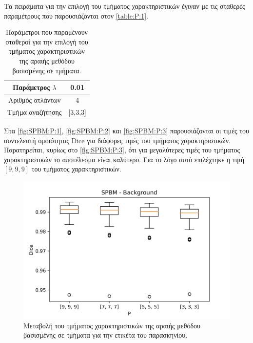 \documentclass[a4paper,12pt]{article}
\begin{document}
Τα πειράματα για την επιλογή του τμήματος χαρακτηριστικών έγιναν με τις σταθερές
παραμέτρους που παρουσιάζονται στον \autoref{table:P:1}.

\begin{table}[h!]
    \centering
    \begin{tabular}{|c|c|} 
        \hline
        Παράμετρος $\lambda$ & 0.01 \\ 
        \hline
        Αριθμός ατλάντων & 4 \\ 
        \hline
        Τμήμα αναζήτησης & [3,3,3] \\ 
        \hline
    \end{tabular}
    \caption{Παράμετροι που παραμένουν σταθεροί για την επιλογή του τμήματος
             χαρακτηριστικών της αραιής μεθόδου βασισμένης σε τμήματα.}
    \label{table:P:1}
\end{table}

Στα \autoref{fig:SPBM:P:1}, \autoref{fig:SPBM:P:2} και \autoref{fig:SPBM:P:3}
παρουσιάζονται οι τιμές του συντελεστή ομοιότητας Dice για διάφορες τιμές του
τμήματος χαρακτηριστικών. Παρατηρείται, κυρίως στο \autoref{fig:SPBM:P:3}, ότι
για μεγαλύτερες τιμές του τμήματος χαρακτηριστικών το αποτέλεσμα είναι καλύτερο.
Για το λόγο αυτό επιλέχτηκε η τιμή $[9,9,9]$ του τμήματος χαρακτηριστικών.

\begin{figure}[H]
    \centering
    \includegraphics[width=0.85\linewidth]{SPBM_P_Background_plot.png}
    \caption{Μεταβολή του τμήματος χαρακτηριστικών της αραιής μεθόδου βασισμένης
             σε τμήματα για την ετικέτα του παρασκηνίου.}
    \label{fig:SPBM:P:1}
\end{figure}
\end{document}
